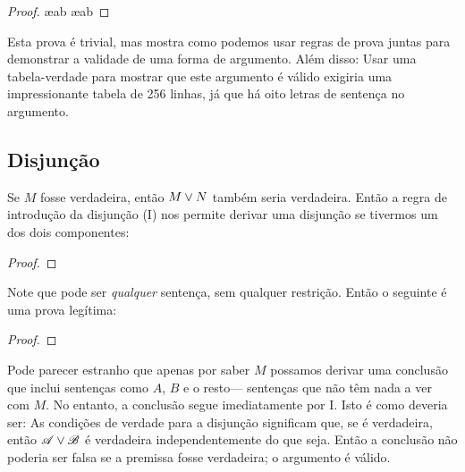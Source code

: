 \begin{proof}

	 \ae{ab}
	 \ae{ab}
	 
\end{proof}

Esta prova é trivial, mas mostra como podemos usar regras de prova juntas para demonstrar a validade de uma forma de argumento. Além disso: Usar uma tabela-verdade para mostrar que este argumento é válido exigiria uma impressionante tabela de 256 linhas, já que há oito letras de sentença no argumento.



\subsection{Disjunção}
Se $M$ fosse verdadeira, então $M \vee N$ também seria verdadeira. Então a regra de introdução da disjunção ({\eor}I) nos permite derivar uma disjunção se tivermos um dos dois componentes:

\begin{proof}
\end{proof}

Note que  pode ser \emph{qualquer} sentença, sem qualquer restrição. Então o seguinte é uma prova legítima:

\begin{proof}
\end{proof}

Pode parecer estranho que apenas por saber $M$ possamos derivar uma conclusão que inclui sentenças como $A$, $B$ e o resto--- sentenças que não têm nada a ver com $M$. No entanto, a conclusão segue imediatamente por {\eor}I. Isto é como deveria ser: As condições de verdade para a disjunção significam que, se  é verdadeira, então $\mathscr{A}\vee \mathscr{B}$ é verdadeira independentemente do que  seja. Então a conclusão não poderia ser falsa se a premissa fosse verdadeira; o argumento é válido.

